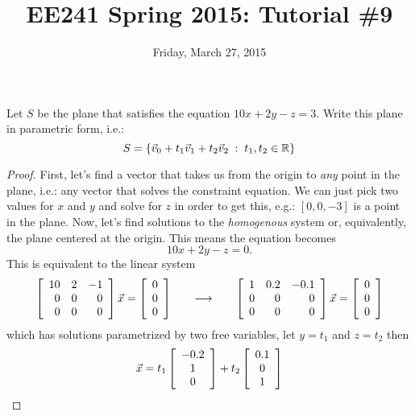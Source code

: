 \documentclass{tutorial}
\begin{document}
\newif\ifsolns

\solnstrue

\title{EE241 Spring 2015: Tutorial \#9}
\date{Friday, March 27, 2015}
\maketitle

\begin{prob}[Planes]
Let $S$ be the plane that satisfies the equation $10x+2y-z = 3$. Write this plane in parametric form, i.e.:
\[S = \left\{ \vec{v}_0 + t_1\vec{v}_1 + t_2 \vec{v}_2 \; : \; t_1, t_2 \in \mathbb{R} \right\} \]
\end{prob} \ifsolns \begin{proof}
First, let's find a vector that takes us from the origin to \emph{any} point in the plane, i.e.: any vector that solves the constraint equation. We can just pick two values for $x$ and $y$ and solve for $z$ in order to get this, e.g.: $[0,0,-3]$ is a point in the plane. Now, let's find solutions to the \emph{homogenous} system or, equivalently, the plane centered at the origin. This means the equation becomes
\[
  10x + 2y - z = 0 .
\]
This is equivalent to the linear system
\[
  \left[ \begin{array}{rrr}
    10 &  2 & -1 \\
     0 &  0 &  0 \\
     0 &  0 &  0
  \end{array} \right] \vec{x}
   = \left[ \begin{array}{c}
    0 \\ 0 \\ 0
   \end{array} \right]
   \hspace{0.25in} \longrightarrow \hspace{0.25in}
  \left[ \begin{array}{rrr}
    1 & 0.2 & -0.1 \\
    0 &   0 &    0 \\
    0 &   0 &    0
  \end{array} \right] \vec{x}
   = \left[ \begin{array}{c}
    0 \\ 0 \\ 0
   \end{array} \right]
\]
which has solutions parametrized by two free variables, let $y = t_1$ and $z = t_2$ then
\[
  \vec{x} = t_1 \left[ \begin{array}{c} -0.2 \\ 1 \\ 0 \end{array} \right] + t_2 \left[ \begin{array}{c} 0.1 \\ 0 \\ 1 \end{array} \right]
\]
\end{proof}
\end{document}
